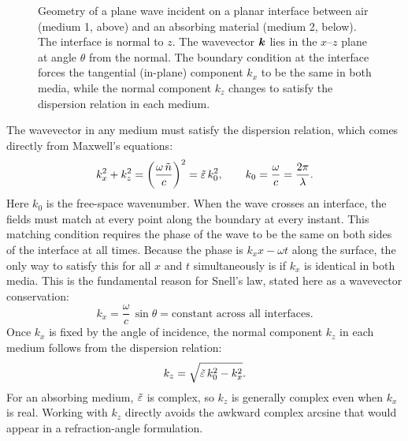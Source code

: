 \begin{figure}[h]
\caption{Geometry of a plane wave incident on a planar interface between
  air (medium 1, above) and an absorbing material (medium 2, below). The
  interface is normal to $z$. The wavevector $\bm{k}$ lies in the $x$--$z$
  plane at angle $\theta$ from the normal. The boundary condition at the
  interface forces the tangential (in-plane) component $k_x$ to be the same
  in both media, while the normal component $k_z$ changes to satisfy the
  dispersion relation in each medium.}
\label{fig:ch2_geometry}
\end{figure}

The wavevector in any medium must satisfy the dispersion relation, which comes
directly from Maxwell's equations:
\begin{equation}
  k_x^2 + k_z^2 = \left(\frac{\omega\,\tilde{n}}{c}\right)^2 = \tilde{\varepsilon}\,k_0^2,
  \qquad k_0 = \frac{\omega}{c} = \frac{2\pi}{\lambda}.
  \label{eq:ch2_dispersion}
\end{equation}
Here $k_0$ is the free-space wavenumber. When the wave crosses an interface,
the fields must match at every point along the boundary at every instant. This
matching condition requires the phase of the wave to be the same on both sides
of the interface at all times. Because the phase is $k_x x - \omega t$ along
the surface, the only way to satisfy this for all $x$ and $t$ simultaneously is
if $k_x$ is identical in both media. This is the fundamental reason for
Snell's law, stated here as a wavevector conservation:
\begin{equation}
  \boxed{k_x = \frac{\omega}{c}\,\sin\theta = \text{constant across all interfaces.}}
  \label{eq:ch2_kx_conserved}
\end{equation}
Once $k_x$ is fixed by the angle of incidence, the normal component $k_z$ in
each medium follows from the dispersion relation:
\begin{equation}
  k_z = \sqrt{\tilde{\varepsilon}\,k_0^2 - k_x^2}.
  \label{eq:ch2_kz}
\end{equation}
For an absorbing medium, $\tilde{\varepsilon}$ is complex, so $k_z$ is generally
complex even when $k_x$ is real. Working with $k_z$ directly avoids the
awkward complex arcsine that would appear in a refraction-angle formulation.

